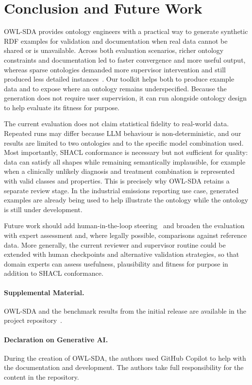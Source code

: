 \section{Conclusion and Future Work}
OWL-SDA provides ontology engineers with a practical way to generate synthetic RDF examples for validation and documentation when real data cannot be shared or is unavailable. Across both evaluation scenarios, richer ontology constraints and documentation led to faster convergence and more useful output, whereas sparse ontologies demanded more supervisor intervention and still produced less detailed instances~\cite{alharbi2021assessing,soares2025exploring}. Our toolkit helps both to produce example data and to expose where an ontology remains underspecified. Because the generation does not require user supervision, it can run alongside ontology design to help evaluate its fitness for purpose.

The current evaluation does not claim statistical fidelity to real-world data. Repeated runs may differ because LLM behaviour is non-deterministic, and our results are limited to two ontologies and to the specific model combination used. Most importantly, SHACL conformance is necessary but not sufficient for quality: data can satisfy all shapes while remaining semantically implausible, for example when a clinically unlikely diagnosis and treatment combination is represented with valid classes and properties. This is precisely why OWL-SDA retains a separate review stage. In the industrial emissions reporting use case, generated examples are already being used to help illustrate the ontology while the ontology is still under development.

Future work should add human-in-the-loop steering~\cite{WU2022364} and broaden the evaluation with expert assessment and, where legally possible, comparisons against reference data. More generally, the current reviewer and supervisor routine could be extended with human checkpoints and alternative validation strategies, so that domain experts can assess usefulness, plausibility and fitness for purpose in addition to SHACL conformance.

\vspace{-0.9em}
\paragraph*{Supplemental Material.}
OWL-SDA and the benchmark results from the initial release are available in the project repository~\cite{owlsda2026}.
\vspace{-1.2em}
\paragraph*{Declaration on Generative AI.}
During the creation of OWL-SDA, the authors used GitHub Copilot to help with the documentation and development. The authors take full responsibility for the content in the repository.